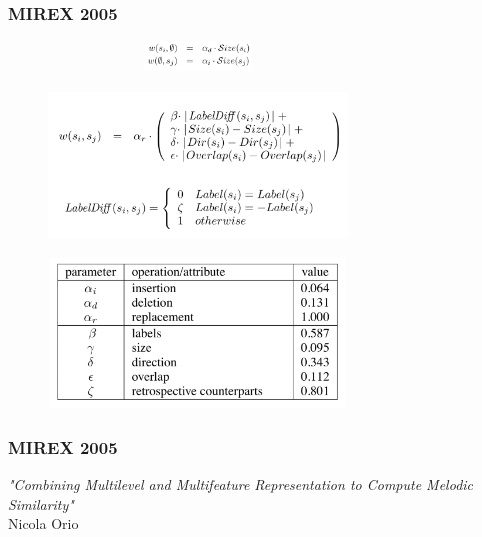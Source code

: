 \documentclass{beamer}
\begin{document}
		\begin{frame}[allowframebreaks]
			\frametitle{MIREX 2005}
			\begin{figure}[h!]
					\includegraphics[width=300px,height=30px,keepaspectratio]{mirex_2005_one_img_one}
			\end{figure}
			\begin{figure}[h!]
					\includegraphics[width=300px,height=150px,keepaspectratio]{mirex_2005_one_img_two}
			\end{figure}
			\begin{figure}[h!]
					\includegraphics[width=300px,height=150px,keepaspectratio]{mirex_2005_one_img_three}
			\end{figure}
		\end{frame}


		\begin{frame}
			\frametitle{MIREX 2005}
			\begin{minipage}{0.45\textwidth}
				\begin{center}
					\textit{"Combining Multilevel and Multifeature Representation to Compute Melodic Similarity"} 
					\cite{mirex_2005_two}\\ 
					Nicola Orio
				\end{center}
			\end{minipage}%
			\begin{minipage}{0.45\textwidth}
				\begin{figure}[h!]
				\end{figure}
			\end{minipage}
		\end{frame}
\end{document}

